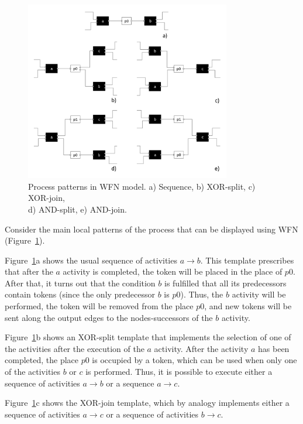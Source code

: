 \documentclass[
11pt,%
tightenlines,%
twoside,%
onecolumn,%
nofloats,%
nobibnotes,%
nofootinbib,%
superscriptaddress,%
noshowpacs,%
centertags]%
{revtex4}
\begin{document}
\begin{figure}[h]
\setcaptionmargin{5mm}
\onelinecaptionsfalse %
\includegraphics[width=0.8\textwidth]{pics/wfn-patterns.pdf}
\caption{Process patterns in WFN model. a) Sequence, b) XOR-split, c) XOR-join,\\d) AND-split, e) AND-join.}
\label{fig:wfn-patterns}
\end{figure}

Consider the main local patterns of the process that can be displayed using WFN (Figure~\ref{fig:wfn-patterns}).

Figure~\ref{fig:wfn-patterns}a shows the usual sequence of activities $a \rightarrow b$.
This template prescribes that after the $a$ activity is completed, the token will be placed in the place of $p0$.
After that, it turns out that the condition $b$ is fulfilled that all its predecessors contain tokens (since the only predecessor $b$ is $p0$).
Thus, the $b$ activity will be performed, the token will be removed from the place $p0$, and new tokens will be sent along the output edges to the nodes-successors of the $b$ activity.
     
Figure~\ref{fig:wfn-patterns}b shows an XOR-split template that implements the selection of one of the activities after the execution of the $a$ activity.
After the activity $a$ has been completed, the place $p0$ is occupied by a token, which can be used when only one of the activities $b$ or $c$ is performed.
Thus, it is possible to execute either a sequence of activities $a \rightarrow b$ or a sequence $a \rightarrow c$.

Figure~\ref{fig:wfn-patterns}c shows the XOR-join template, which by analogy implements either a sequence of activities $a \rightarrow c$ or a sequence of activities $b \rightarrow c$.
\end{document}
